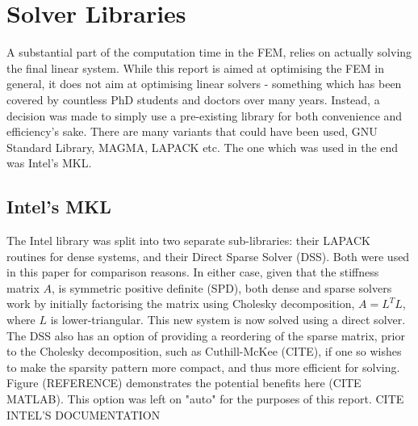 \section{Solver Libraries}

A substantial part of the computation time in the FEM, relies on actually solving the final linear system. While this report is aimed at optimising the FEM in general, it does not aim at optimising linear solvers - something which has been covered by countless PhD students and doctors over many years. Instead, a decision was made to simply use a pre-existing library for both convenience and efficiency's sake. There are many variants that could have been used, GNU Standard Library, MAGMA, LAPACK etc. The one which was used in the end was Intel's MKL.

\subsection{Intel's MKL}

The Intel library was split into two separate sub-libraries: their LAPACK routines for dense systems, and their Direct Sparse Solver (DSS). Both were used in this paper for comparison reasons. In either case, given that the stiffness matrix $A$, is symmetric positive definite (SPD), both dense and sparse solvers work by initially factorising the matrix using Cholesky decomposition, $A = L^T L$, where $L$ is lower-triangular. This new system is now solved using a direct solver. The DSS also has an option of providing a reordering of the sparse matrix, prior to the Cholesky decomposition, such as Cuthill-McKee (CITE), if one so wishes to make the sparsity pattern more compact, and thus more efficient for solving. Figure (REFERENCE) demonstrates the potential benefits here (CITE MATLAB). This option was left on "auto" for the purposes of this report. 
CITE INTEL'S DOCUMENTATION